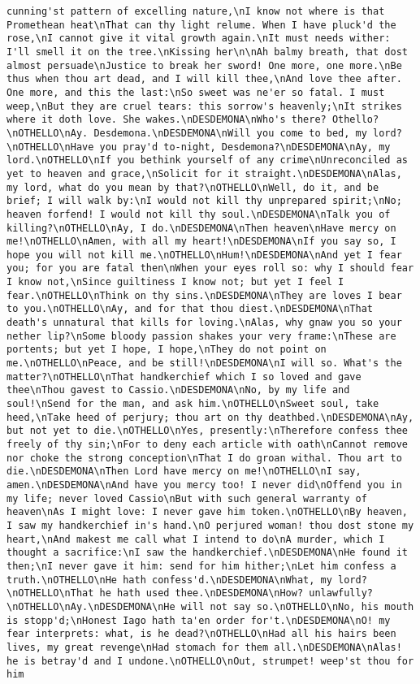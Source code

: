 \begin{verbatim}
cunning'st pattern of excelling nature,\nI know not where is that Promethean heat\nThat can thy light relume. When I have pluck'd the rose,\nI cannot give it vital growth again.\nIt must needs wither: I'll smell it on the tree.\nKissing her\n\nAh balmy breath, that dost almost persuade\nJustice to break her sword! One more, one more.\nBe thus when thou art dead, and I will kill thee,\nAnd love thee after. One more, and this the last:\nSo sweet was ne'er so fatal. I must weep,\nBut they are cruel tears: this sorrow's heavenly;\nIt strikes where it doth love. She wakes.\nDESDEMONA\nWho's there? Othello?\nOTHELLO\nAy. Desdemona.\nDESDEMONA\nWill you come to bed, my lord?\nOTHELLO\nHave you pray'd to-night, Desdemona?\nDESDEMONA\nAy, my lord.\nOTHELLO\nIf you bethink yourself of any crime\nUnreconciled as yet to heaven and grace,\nSolicit for it straight.\nDESDEMONA\nAlas, my lord, what do you mean by that?\nOTHELLO\nWell, do it, and be brief; I will walk by:\nI would not kill thy unprepared spirit;\nNo; heaven forfend! I would not kill thy soul.\nDESDEMONA\nTalk you of killing?\nOTHELLO\nAy, I do.\nDESDEMONA\nThen heaven\nHave mercy on me!\nOTHELLO\nAmen, with all my heart!\nDESDEMONA\nIf you say so, I hope you will not kill me.\nOTHELLO\nHum!\nDESDEMONA\nAnd yet I fear you; for you are fatal then\nWhen your eyes roll so: why I should fear I know not,\nSince guiltiness I know not; but yet I feel I fear.\nOTHELLO\nThink on thy sins.\nDESDEMONA\nThey are loves I bear to you.\nOTHELLO\nAy, and for that thou diest.\nDESDEMONA\nThat death's unnatural that kills for loving.\nAlas, why gnaw you so your nether lip?\nSome bloody passion shakes your very frame:\nThese are portents; but yet I hope, I hope,\nThey do not point on me.\nOTHELLO\nPeace, and be still!\nDESDEMONA\nI will so. What's the matter?\nOTHELLO\nThat handkerchief which I so loved and gave thee\nThou gavest to Cassio.\nDESDEMONA\nNo, by my life and soul!\nSend for the man, and ask him.\nOTHELLO\nSweet soul, take heed,\nTake heed of perjury; thou art on thy deathbed.\nDESDEMONA\nAy, but not yet to die.\nOTHELLO\nYes, presently:\nTherefore confess thee freely of thy sin;\nFor to deny each article with oath\nCannot remove nor choke the strong conception\nThat I do groan withal. Thou art to die.\nDESDEMONA\nThen Lord have mercy on me!\nOTHELLO\nI say, amen.\nDESDEMONA\nAnd have you mercy too! I never did\nOffend you in my life; never loved Cassio\nBut with such general warranty of heaven\nAs I might love: I never gave him token.\nOTHELLO\nBy heaven, I saw my handkerchief in's hand.\nO perjured woman! thou dost stone my heart,\nAnd makest me call what I intend to do\nA murder, which I thought a sacrifice:\nI saw the handkerchief.\nDESDEMONA\nHe found it then;\nI never gave it him: send for him hither;\nLet him confess a truth.\nOTHELLO\nHe hath confess'd.\nDESDEMONA\nWhat, my lord?\nOTHELLO\nThat he hath used thee.\nDESDEMONA\nHow? unlawfully?\nOTHELLO\nAy.\nDESDEMONA\nHe will not say so.\nOTHELLO\nNo, his mouth is stopp'd;\nHonest Iago hath ta'en order for't.\nDESDEMONA\nO! my fear interprets: what, is he dead?\nOTHELLO\nHad all his hairs been lives, my great revenge\nHad stomach for them all.\nDESDEMONA\nAlas! he is betray'd and I undone.\nOTHELLO\nOut, strumpet! weep'st thou for him 
\end{verbatim}
